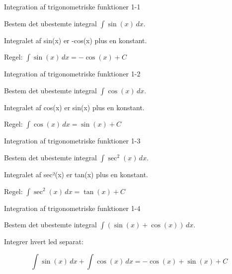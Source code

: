 \documentclass{article}
\begin{document}

\tableofcontents
\newpage

\begin{exercise}{Integration af trigonometriske funktioner 1-1}

Bestem det ubestemte integral $\int \sin(x) \, dx$.


\hint

Integralet af sin(x) er -cos(x) plus en konstant.

\hint

Regel: $\int \sin(x) \, dx = -\cos(x) + C$

\end{exercise}

\newpage

\begin{exercise}{Integration af trigonometriske funktioner 1-2}

Bestem det ubestemte integral $\int \cos(x) \, dx$.


\hint

Integralet af cos(x) er sin(x) plus en konstant.

\hint

Regel: $\int \cos(x) \, dx = \sin(x) + C$

\end{exercise}

\newpage

\begin{exercise}{Integration af trigonometriske funktioner 1-3}

Bestem det ubestemte integral $\int \sec^2(x) \, dx$.


\hint

Integralet af sec²(x) er tan(x) plus en konstant.

\hint

Regel: $\int \sec^2(x) \, dx = \tan(x) + C$

\end{exercise}

\newpage

\begin{exercise}{Integration af trigonometriske funktioner 1-4}

Bestem det ubestemte integral $\int (\sin(x) + \cos(x)) \, dx$.


\hint

Integrer hvert led separat:

\hint
\[
\int \sin(x) \, dx + \int \cos(x) \, dx = -\cos(x) + \sin(x) + C
\]

\end{exercise}
\end{document}
